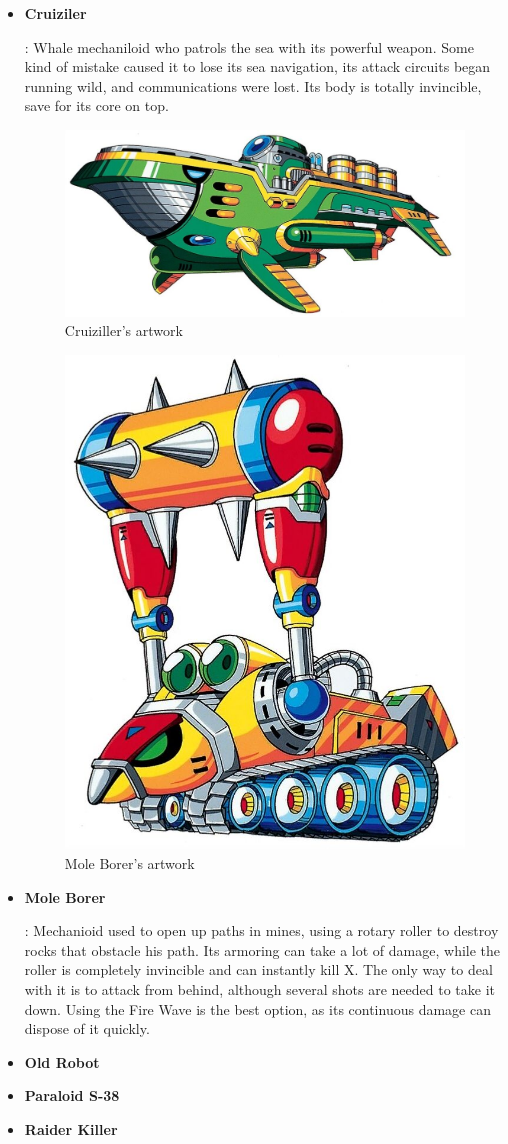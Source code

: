 \begin{itemize}
		\item \hypertarget{miniboss:Cruiziler}{\textbf{Cruiziler}}: Whale mechaniloid who patrols the sea with its powerful weapon. Some kind of mistake caused it to lose its sea navigation, its attack circuits began running wild, and communications were lost. Its body is totally invincible, save for its core on top.
		\begin{figure}[htp]
			\centering
			\includegraphics[width=0.4\linewidth]{figures/X1/Enemies/Cruiziller.jpg}
			\caption{Cruiziller's artwork}
		\end{figure}
		
		\begin{figure}[htp]
		\centering
		\includegraphics[width=0.3\linewidth]{figures/X1/Enemies/MoleBorer.jpg}
		\caption{Mole Borer's artwork}
		\end{figure}
	
		\item \hypertarget{miniboss:Mole_Borer}{\textbf{Mole Borer}}:
		Mechanioid used to open up paths in mines, using a 
		rotary roller to destroy rocks that obstacle his path. Its armoring can take a lot of damage, while the roller is completely invincible and can instantly kill X. The only way to deal with it is to attack from behind, although several shots are needed to take it down. Using the Fire Wave is the best option, as its continuous damage can dispose of it quickly.
	
		\item \hypertarget{miniboss:Old_robot}{\textbf{Old Robot}}
	
		\item \hypertarget{miniboss:Paraloid_S-38}{\textbf{Paraloid S-38}} 
	

		\item \hypertarget{miniboss:Raider_Killer}{\textbf{Raider Killer}}
		

\end{itemize}
